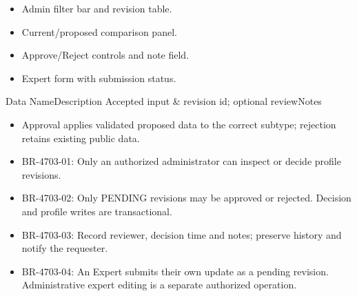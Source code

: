 \begin{itemize}[leftmargin=1.6em,topsep=3pt,itemsep=2pt,parsep=0pt,label=$\bullet$]
    \item Admin filter bar and revision table.
    \item Current/proposed comparison panel.
    \item Approve/Reject controls and note field.
    \item Expert form with submission status.
\end{itemize}


\begin{specdatatable}{Data Name}{Description}
Accepted input & revision id; optional reviewNotes\\ \hline
\end{specdatatable}

\begin{itemize}[leftmargin=1.6em,topsep=3pt,itemsep=2pt,parsep=0pt,label=$\bullet$]
    \item Approval applies validated proposed data to the correct subtype; rejection retains existing public data.
\end{itemize}

\begin{itemize}[leftmargin=1.6em,topsep=3pt,itemsep=2pt,parsep=0pt,label=$\bullet$]\brrulelist
    \item BR-4703-01: Only an authorized administrator can inspect or decide profile revisions.
    \item BR-4703-02: Only PENDING revisions may be approved or rejected. Decision and profile writes are transactional.
    \item BR-4703-03: Record reviewer, decision time and notes; preserve history and notify the requester.
    \item BR-4703-04: An Expert submits their own update as a pending revision. Administrative expert editing is a separate authorized operation.
\end{itemize}

